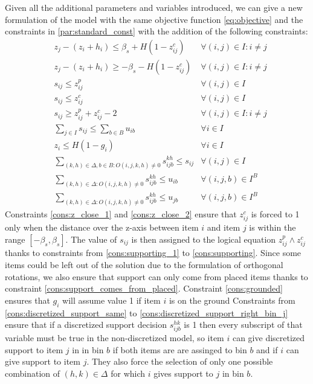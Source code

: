 Given all the additional parameters and variables introduced, we can give a new formulation of the model with the same objective function \ref{eq:objective} and the constraints in \cref{par:standard_const} with the addition of the following constraints:
\label{par:support_const}
\begin{align}
    & z_j - (z_i + h_i) \le \beta_s + H (1 - z^c_{ij}) & \forall (i, j) \in I : i \neq j \label{cons:z_close_1} \\
    & z_j - (z_i + h_i) \ge -\beta_s - H (1 - z^c_{ij}) & \forall (i, j) \in I : i \neq j \label{cons:z_close_2} \\
    & s_{ij} \le z^p_{ij} & \forall (i, j) \in I  \label{cons:supporting_1} \\
    & s_{ij} \le z^c_{ij} & \forall (i, j) \in I  \label{cons:supporting_2} \\
    & s_{ij} \ge z^p_{ij} + z^c_{ij} - 2 & \forall (i, j) \in I : i \neq j \label{cons:supporting} \\
    & \sum\limits_{j \in I}{s_{ij}} \le \sum\limits_{b \in B}{u_{ib}} & \forall i \in I  \label{cons:support_comes_from_placed} \\
    & z_i \le H(1 - g_i) & \forall i \in I \label{cons:grounded} \\
    & \sum\limits_{(k, h) \in \Delta, b \in B : O(i, j, k, h) \neq 0} s^{k h}_{i j b} \le s_{ij} & \forall (i, j) \in I \label{cons:discretized_support_same} \\
    & \sum\limits_{(k, h) \in \Delta : O(i, j, k, h) \neq 0} s^{k h}_{i j b} \le u_{ib} & \forall (i, j, b) \in I^B \label{cons:discretized_support_right_bin_i} \\
    & \sum\limits_{(k, h) \in \Delta : O(i, j, k, h) \neq 0} s^{k h}_{i j b} \le u_{jb} & \forall (i, j, b) \in I^B \label{cons:discretized_support_right_bin_j}
\end{align}
Constraints \ref{cons:z_close_1} and \ref{cons:z_close_2} ensure that $z^c_{ij}$ is forced to 1 only when the distance over the z-axis between item $i$ and item $j$ is within the range $[-\beta_s, \beta_s]$.
The value of $s_{ij}$ is then assigned to the logical equation $z^p_{ij} \land z^c_{ij}$ thanks to constraints from \ref{cons:supporting_1} to \ref{cons:supporting}.
Since some items could be left out of the solution due to the formulation of orthogonal rotations, we also ensure that support can only come from placed items thanks to constraint \ref{cons:support_comes_from_placed}.
Constraint \ref{cons:grounded} ensures that $g_i$ will assume value 1 if item $i$ is on the ground
Constraints from \ref{cons:discretized_support_same} to \ref{cons:discretized_support_right_bin_j} ensure that if a discretized support decision $s_{ijb}^{hk}$ is 1 then every subscript of that variable must be true in the non-discretized model, so item $i$ can give discretized support to item $j$ in in bin $b$ if both items are are assinged to bin $b$ and if $i$ can give support to item $j$. They also force the selection of only one possible combination of $(h,k) \in \Delta$ for which $i$ gives support to $j$ in bin $b$.

